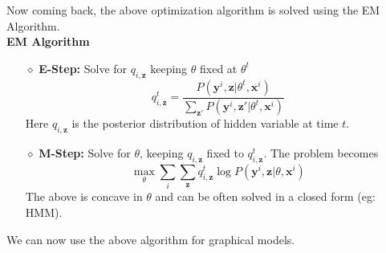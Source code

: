 Now coming back, the above optimization algorithm is solved using the EM Algorithm. \\
\textbf{EM Algorithm}\\
\begin{itemize}
	\item[$\diamond$] \textbf{E-Step:} Solve for $q_{i, \mathbf z}$ keeping $\theta$ fixed at $\theta^t$
	\begin{equation}
		q_{i, \mathbf z}^t = \dfrac{P(\mathbf y^i, \mathbf z|\theta^t, \mathbf x^i)}{\sum_{\mathbf z'} P(\mathbf y^i, \mathbf z'|\theta^t, \mathbf x^i)}
	\end{equation}
	Here $q_{i, \mathbf z}$ is the posterior distribution of hidden variable at time $t$. \\
	\item[$\diamond$] \textbf{M-Step:} Solve for $\theta$, keeping $q_{i, \mathbf z}$ fixed to $q_{i, \mathbf z}^t$. The problem becomes
	\begin{equation}
		\max_\theta \sum_i \sum_{\mathbf z} q_{i, \mathbf z}^t \log P(\mathbf y^i, \mathbf z|\theta, \mathbf x^i)
	\end{equation}
The above is concave in $\theta$ and can be often solved in a closed form (eg: HMM).
\end{itemize}
We can now use the above algorithm for graphical models.
